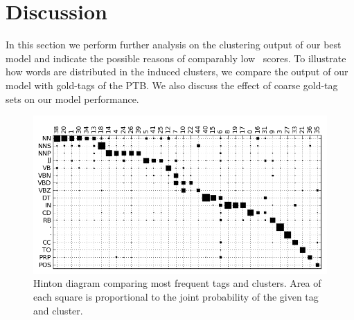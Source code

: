 \section{Discussion}
\label{sec:discuss}

In this section we perform further analysis on the clustering output
of our best model and indicate the possible reasons of comparably low
\vm\ scores.  To illustrate how words are distributed in the induced
clusters, we compare the output of our model with gold-tags of the
PTB.  We also discuss the effect of coarse gold-tag sets on our model
performance.
\begin{figure}[ht] \centering
\includegraphics[width=\textwidth]{hinton.png}
\caption{Hinton diagram comparing most frequent tags and clusters.
  Area of each square is proportional to the joint probability of the
  given tag and cluster.}
\label{plot-hinton}
\end{figure}

